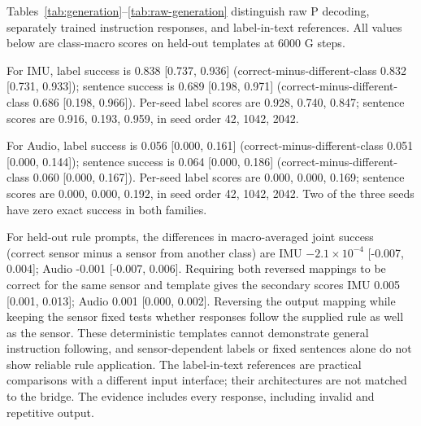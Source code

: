 Tables~\ref{tab:generation}--\ref{tab:raw-generation} distinguish raw P decoding, separately trained instruction responses, and label-in-text references. All values below are class-macro scores on held-out templates at 6000 G steps.

For IMU, label success is 0.838 [0.737, 0.936] (correct-minus-different-class 0.832 [0.731, 0.933]); sentence success is 0.689 [0.198, 0.971] (correct-minus-different-class 0.686 [0.198, 0.966]). Per-seed label scores are 0.928, 0.740, 0.847; sentence scores are 0.916, 0.193, 0.959, in seed order 42, 1042, 2042.

For Audio, label success is 0.056 [0.000, 0.161] (correct-minus-different-class 0.051 [0.000, 0.144]); sentence success is 0.064 [0.000, 0.186] (correct-minus-different-class 0.060 [0.000, 0.167]). Per-seed label scores are 0.000, 0.000, 0.169; sentence scores are 0.000, 0.000, 0.192, in seed order 42, 1042, 2042. Two of the three seeds have zero exact success in both families.

For held-out rule prompts, the differences in macro-averaged joint success (correct sensor minus a sensor from another class) are IMU $-2.1\times10^{-4}$ [-0.007, 0.004]; Audio -0.001 [-0.007, 0.006]. Requiring both reversed mappings to be correct for the same sensor and template gives the secondary scores IMU 0.005 [0.001, 0.013]; Audio 0.001 [0.000, 0.002]. Reversing the output mapping while keeping the sensor fixed tests whether responses follow the supplied rule as well as the sensor. These deterministic templates cannot demonstrate general instruction following, and sensor-dependent labels or fixed sentences alone do not show reliable rule application. The label-in-text references are practical comparisons with a different input interface; their architectures are not matched to the bridge. The evidence includes every response, including invalid and repetitive output.
